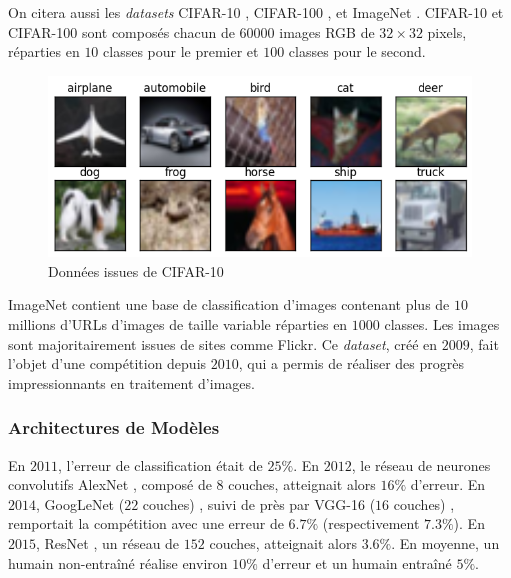 \documentclass[a4paper, 11pt]{report}
\begin{document}
On citera aussi les \emph{datasets} CIFAR-10 \citep{Krizhevsky2009}, CIFAR-100 \citep{Krizhevsky2009a}, et ImageNet \citep{Krizhevsky2012a}.
CIFAR-10 et CIFAR-100 sont composés chacun de $60000$ images RGB de $32 \times 32$ pixels, réparties en $10$ classes pour le premier et $100$ classes pour le second.
\begin{figure}[H]
	\centering
	\includegraphics[scale=0.4]{Images/CIFAR-10.png}
	\caption{Données issues de CIFAR-10}
\end{figure}
ImageNet contient une base de classification d'images contenant plus de $10$ millions d'URLs d'images de taille variable réparties en $1000$ classes. Les images sont majoritairement issues de sites comme Flickr.
Ce \emph{dataset}, créé en $2009$, fait l'objet d'une compétition depuis $2010$, qui a permis de réaliser des progrès impressionnants en traitement d'images.
\subsubsection{Architectures de Modèles}
En $2011$, l'erreur de classification était de $25\%$. En $2012$, le réseau de neurones convolutifs AlexNet \citep{Krizhevsky2012}, composé de $8$ couches, atteignait alors $16\%$ d'erreur. En $2014$, GoogLeNet ($22$ couches) \citep{Szegedy2015}, suivi de près par VGG-16 ($16$ couches) \citep{Simonyan2014}, remportait la compétition avec une erreur de $6.7\%$ (respectivement $7.3\%$). En $2015$, ResNet \citep{He2015}, un réseau de $152$ couches, atteignait alors $3.6\%$. En moyenne, un humain non-entraîné réalise environ $10\%$ d'erreur et un humain entraîné $5\%$.
\end{document}
